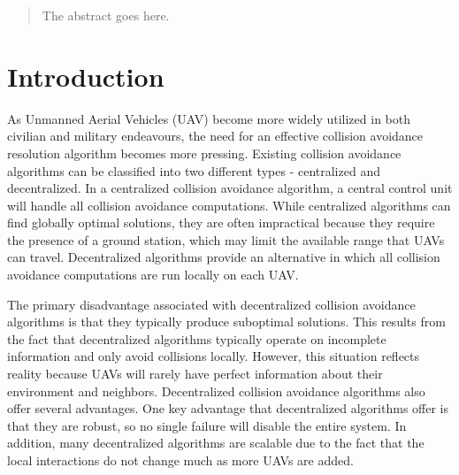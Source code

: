 \documentclass[conference]{IEEEtran}
\begin{document}
\maketitle


\begin{abstract}
The abstract goes here.
\end{abstract}




%
\IEEEpeerreviewmaketitle



\section{Introduction}


As Unmanned Aerial Vehicles (UAV) become more widely utilized in both civilian and military endeavours, the need for an effective collision avoidance resolution algorithm becomes more pressing. 
Existing collision avoidance algorithms can be classified into two different types - centralized and decentralized.  
In a centralized collision avoidance algorithm, a central control unit will handle all collision avoidance computations. 
While centralized algorithms can find globally optimal solutions, they are often impractical because they require the presence of a ground station, which may limit the available range that UAVs can travel. Decentralized algorithms provide an alternative in which all collision avoidance computations are run locally on each UAV.

The primary disadvantage associated with decentralized collision avoidance algorithms is that they typically produce suboptimal solutions.  This results from the fact that decentralized algorithms typically operate on incomplete information and only avoid collisions locally. However, this situation reflects reality because UAVs will rarely have perfect information about their environment and neighbors. Decentralized collision avoidance algorithms also offer several advantages. One key advantage that decentralized algorithms offer is that they are robust, so no single failure will disable the entire system. In addition, many decentralized algorithms are scalable due to the fact that the local interactions do not change much as more UAVs are added.
\end{document}
